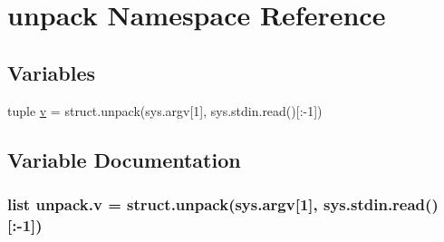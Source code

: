 \hypertarget{namespaceunpack}{\section{unpack Namespace Reference}
\label{namespaceunpack}
}
\subsection*{Variables}
\begin{DoxyCompactItemize}
\item 
tuple \hyperlink{namespaceunpack_a784acbad20f17d1f6ba7d74c899a3fea}{v} = struct.\-unpack(sys.\-argv\mbox{[}1\mbox{]}, sys.\-stdin.\-read()\mbox{[}\-:-\/1\mbox{]})
\end{DoxyCompactItemize}


\subsection{Variable Documentation}
\hypertarget{namespaceunpack_a784acbad20f17d1f6ba7d74c899a3fea}{
\subsubsection[{v}]{\setlength{\rightskip}{0pt plus 5cm}list unpack.\-v = struct.\-unpack(sys.\-argv\mbox{[}1\mbox{]}, sys.\-stdin.\-read()\mbox{[}\-:-\/1\mbox{]})}}\label{namespaceunpack_a784acbad20f17d1f6ba7d74c899a3fea}
